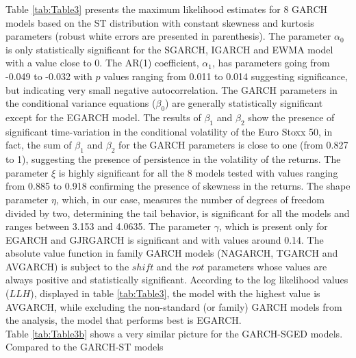 \documentclass[a4paper, nobind]{templates/ociamthesis}
\begin{document}
\clearpage
\newpage

\noindent Table \ref{tab:Table3} presents the maximum likelihood estimates for 8 GARCH models based on the ST distribution with constant skewness and kurtosis parameters (robust white errors are presented in parenthesis). The parameter \(\alpha_0\) is only statistically significant for the SGARCH, IGARCH and EWMA model with a value close to 0. The AR(1) coefficient, \(\alpha_1\), has parameters going from -0.049 to -0.032 with \(p\) values ranging from 0.011 to 0.014 suggesting significance, but indicating very small negative autocorrelation. The GARCH parameters in the conditional variance equations (\(\beta_0\)) are generally statistically significant except for the EGARCH model. The results of \(\beta_1\) and \(\beta_2\) show the presence of significant time-variation in the conditional volatility of the Euro Stoxx 50, in fact, the sum of \(\beta_1\) and \(\beta_2\) for the GARCH parameters is close to one (from 0.827 to 1), suggesting the presence of persistence in the volatility of the returns. The parameter \(\xi\) is highly significant for all the 8 models tested with values ranging from 0.885 to 0.918 confirming the presence of skewness in the returns. The shape parameter \(\eta\), which, in our case, measures the number of degrees of freedom divided by two, determining the tail behavior, is significant for all the models and ranges between 3.153 and 4.0635. The parameter \(\gamma\), which is present only for EGARCH and GJRGARCH is significant and with values around 0.14. The absolute value function in family GARCH models (NAGARCH, TGARCH and AVGARCH) is subject to the \(shift\) and the \(rot\) parameters whose values are always positive and statistically significant. According to the log likelihood values (\(LLH\)), displayed in table \ref{tab:Table3}, the model with the highest value is AVGARCH, while excluding the non-standard (or family) GARCH models from the analysis, the model that performs best is EGARCH.~\\

\noindent Table \ref{tab:Table3b} shows a very similar picture for the GARCH-SGED models. Compared to the GARCH-ST models
\end{document}

